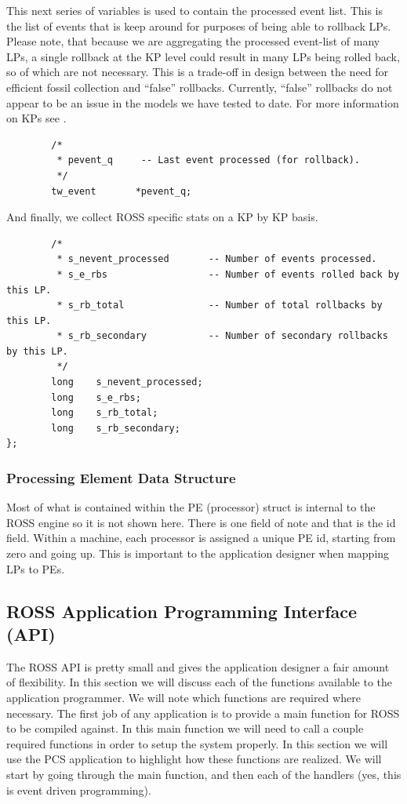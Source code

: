 \documentclass[12pt]{article}
\begin{document}
This next series of variables is used to contain the processed event
list. This is the list of events that is keep around for purposes of
being able to rollback LPs. Please note, that because we are
aggregating the processed event-list of many LPs, a single rollback at
the KP level could result in many LPs being rolled back, so of which
are not necessary.  This is a trade-off in design between the need for
efficient fossil collection and ``false'' rollbacks. Currently,
``false'' rollbacks do not appear to be an issue in the models we have
tested to date. For more information on KPs see
\cite{carothers-pads-2000}.

\begin{verbatim}
        /*
         * pevent_q     -- Last event processed (for rollback).
         */
        tw_event       *pevent_q;
\end{verbatim}

And finally, we collect ROSS specific stats on a KP by KP basis.

\begin{verbatim}
        /*
         * s_nevent_processed       -- Number of events processed.
         * s_e_rbs                  -- Number of events rolled back by this LP.
         * s_rb_total               -- Number of total rollbacks by this LP.
         * s_rb_secondary           -- Number of secondary rollbacks by this LP.
         */
        long    s_nevent_processed;
        long    s_e_rbs;
        long    s_rb_total;
        long    s_rb_secondary;
};
\end{verbatim}
 
\subsubsection{Processing Element Data Structure}
Most of what is contained within the PE (processor) struct is internal
to the ROSS engine so it is not shown here.  There is one field of
note and that is the id field.  Within a machine, each processor is
assigned a unique PE id, starting from zero and going up.  This is
important to the application designer when mapping LPs to PEs.
 
\subsection{ROSS Application Programming Interface (API)}
The ROSS API is pretty small and gives the application designer a fair
amount of flexibility.  In this section we will discuss each of the
functions available to the application programmer.  We will note which
functions are required where necessary.  The first job of any
application is to provide a main function for ROSS to be compiled
against.  In this main function we will need to call a couple required
functions in order to setup the system properly.  In this section we
will use the PCS application to highlight how these functions are
realized.  We will start by going through the main function, and then
each of the handlers (yes, this is event driven programming).
\end{document}
